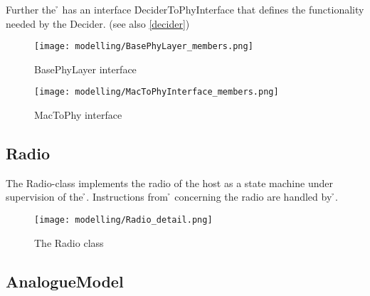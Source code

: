 Further the \h{\bp} has an interface \h{DeciderToPhyInterface} that defines the functionality
needed by the Decider. (see also \ref{decider})
\label{SignalCreation}

\begin{figure}[H]
 \centering
 \texttt{[image: modelling/BasePhyLayer\_members.png]}
 \caption{BasePhyLayer interface}
 \label{fig: BasePhyLayer interface}
\end{figure}

\begin{figure}[H]
 \centering
 \texttt{[image: modelling/MacToPhyInterface\_members.png]}
 \caption{MacToPhy interface}
 \label{fig: The MacToPhyInterface}
\end{figure}

\subsection{Radio}
\label{radio}

The Radio-class implements the radio of the host as a state machine under supervision
of the \h{\bp}. Instructions from \h{\bm} concerning the radio are handled by \h{\bp}.

\begin{figure}[H]
 \centering
 \texttt{[image: modelling/Radio\_detail.png]}
 \caption{The Radio class}
 \label{fig: radio}
\end{figure}

\subsection{AnalogueModel}



